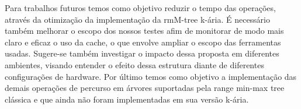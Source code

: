 Para trabalhos futuros temos como objetivo reduzir o tempo das operações, através da otimização da implementação da rmM-tree k-ária. É necessário também melhorar o escopo dos nossos testes afim de monitorar de  modo mais claro e eficaz o uso da cache, o que envolve ampliar o escopo das ferramentas usadas. Sugere-se também investigar o impacto dessa proposta em diferentes ambientes, visando entender o efeito dessa estrutura diante de diferentes configurações de hardware. Por último temos como objetivo a implementação das demais operações de percurso em árvores suportadas pela range min-max tree clássica e que ainda não foram implementadas em sua versão k-ária. 

